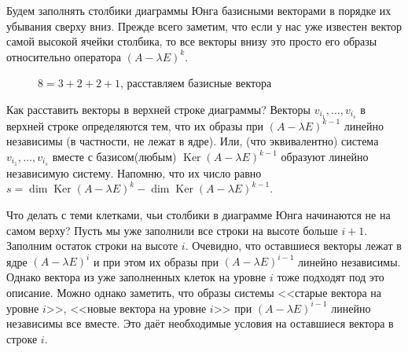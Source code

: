 \documentclass[10pt,a4paper,oneside]{book}
\theoremstyle{definition}
\DeclareMathOperator{\Ker}{Ker}
\begin{document}
Будем заполнять столбики диаграммы Юнга базисными векторами в порядке их убывания сверху вниз. Прежде всего заметим, что если у нас уже известен вектор самой высокой ячейки столбика, то все векторы внизу это просто его образы относительно оператора $(A-\lambda E)^k$. 

\begin{figure}[hhh]
\begin{center}
\end{center}
\caption{$8=3+2+2+1$, расставляем базисные вектора}
\end{figure}

Как расставить векторы в верхней строке диаграммы? Векторы $v_{i_1}, \dots, v_{i_s}$  в верхней строке определяются тем, что их образы при $(A-\lambda E)^{k-1}$ линейно независимы (в частности, не лежат в ядре). Или, (что эквивалентно) система $v_{i_1}, \dots, v_{i_s}$ вместе с базисом(любым) $\Ker (A-\lambda E)^{k-1}$ образуют линейно независимую систему. Напомню, что их число равно $s=\dim \Ker (A-\lambda E)^k - \dim \Ker (A-\lambda E)^{k-1}$.



Что делать с теми клетками, чьи столбики в диаграмме Юнга начинаются не на самом верху? Пусть мы уже заполнили все строки на высоте больше $i+1$. Заполним остаток строки на высоте $i$.  Очевидно, что оставшиеся векторы лежат в ядре $(A-\lambda E)^{i}$ и при этом их образы при $(A-\lambda E)^{i-1}$ линейно независимы. Однако вектора из уже заполненных клеток на уровне $i$ тоже подходят под это описание. Можно однако заметить, что образы системы <<старые вектора на уровне $i$>>, <<новые вектора на уровне $i$>> при $(A-\lambda E)^{i-1}$ линейно независимы все вместе. Это даёт необходимые условия на оставшиеся вектора в строке $i$.  
\end{document}
